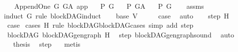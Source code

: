 \begin{isabellebody}
\ \ \ Append{\isacharunderscore}{\kern0pt}One\ G\ G{\isacharunderscore}{\kern0pt}A\ app\isanewline
\ \ {\isasymLongrightarrow}\ {\isacharparenleft}{\kern0pt}P\ G{\isacharparenright}{\kern0pt}\isanewline
\ \ {\isasymLongrightarrow}\ P\ G{\isacharunderscore}{\kern0pt}A{\isachardoublequoteclose}\isanewline
\ \ \ {\isachardoublequoteopen}P\ G{\isachardoublequoteclose}\isanewline
%
\isadelimproof
\ \ %
\endisadelimproof
%
\isatagproof
{}\isamarkupfalse%
\ assms\isanewline
{}\isamarkupfalse%
{\isacharparenleft}{\kern0pt}induct\ G\ rule{\isacharcolon}{\kern0pt}\ blockDAG{\isacharunderscore}{\kern0pt}induct{\isacharparenright}{\kern0pt}\isanewline
\ \ \isamarkupfalse%
\ {\isacharparenleft}{\kern0pt}base\ V{\isacharparenright}{\kern0pt}\isanewline
\ \ \isamarkupfalse%
\ \isamarkupfalse%
\ {\isacharquery}{\kern0pt}case\ \isamarkupfalse%
\ auto\isanewline
{}\isamarkupfalse%
\isanewline
\ \ \isamarkupfalse%
\ {\isacharparenleft}{\kern0pt}step\ H{\isacharparenright}{\kern0pt}\isanewline
\ \ \isamarkupfalse%
\ {\isacharquery}{\kern0pt}case\ \isamarkupfalse%
{\isacharparenleft}{\kern0pt}cases\ H\ rule{\isacharcolon}{\kern0pt}\ blockDAG{\isachardot}{\kern0pt}blockDAG{\isacharunderscore}{\kern0pt}cases{}{\isacharcomma}{\kern0pt}\ simp\ add{\isacharcolon}{\kern0pt}\ step{\isacharparenright}{\kern0pt}\isanewline
\ \ \ \ \isamarkupfalse%
\ {}\isanewline
\ \ \ \ \isamarkupfalse%
\ \isamarkupfalse%
\ {\isachardoublequoteopen}blockDAG\ {\isacharparenleft}{\kern0pt}blockDAG{\isachardot}{\kern0pt}gen{\isacharunderscore}{\kern0pt}graph\ H{\isacharparenright}{\kern0pt}{\isachardoublequoteclose}\ \isamarkupfalse%
\ step{\isacharparenleft}{\kern0pt}{}{\isacharparenright}{\kern0pt}\ blockDAG{\isachardot}{\kern0pt}gen{\isacharunderscore}{\kern0pt}graph{\isacharunderscore}{\kern0pt}sound\ \isamarkupfalse%
\ auto\isanewline
\ \ \ \ \isamarkupfalse%
\ \isamarkupfalse%
\ {\isacharquery}{\kern0pt}thesis\ \isamarkupfalse%
\ step{\isacharparenleft}{\kern0pt}{}{\isacharparenright}{\kern0pt}\ {}\ \isamarkupfalse%
\ metis\ \isanewline
\ \ \isamarkupfalse%
\isanewline
\ \ \ \ \isamarkupfalse%
\ {}\isanewline
\ \ \ \ \isamarkupfalse%
\ \isamarkupfalse%

\end{isabellebody}
